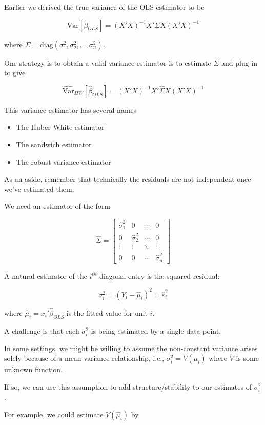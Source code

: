 \documentclass[
  letterpaper,
  DIV=11,
  numbers=noendperiod]{scrreport}
\providecommand{\tightlist}{%
  \setlength{\itemsep}{0pt}\setlength{\parskip}{0pt}}\usepackage{longtable,booktabs,array}
\begin{document}
Earlier we derived the true variance of the OLS estimator to be

\[\text{Var}[\hat \beta_{OLS}] = (X'X)^{-1} X' \Sigma X(X'X)^{-1}
\]

where \(\Sigma = \text{diag}(\sigma_1^2, \sigma_2^2, ..., \sigma_n^2)\).

One strategy is to obtain a valid variance estimator is to estimate
\(\Sigma\) and plug-in to give

\[\widehat{\text{Var}}_{HW}[\hat \beta_{OLS}] = (X'X)^{-1} X' \hat \Sigma X (X'X)^{-1}
\]

This variance estimator has several names

\begin{itemize}
\tightlist
\item
  The Huber-White estimator
\item
  The sandwich estimator
\item
  The robust variance estimator
\end{itemize}

As an aside, remember that technically the residuals are not independent
once we've estimated them.

We need an estimator of the form

\[\hat \Sigma = \begin{bmatrix}
\hat \sigma_1^2 & 0 & \cdots & 0 \\ 
0 & \hat \sigma_2^2 & \cdots & 0 \\ 
\vdots & \vdots & \ddots & \vdots \\ 
0 & 0 & \cdots & \hat \sigma_n^2
\end{bmatrix} 
\]

A natural estimator of the \(i^{th}\) diagonal entry is the squared
residual:

\[\sigma_i^2 = (Y_i - \hat \mu_i)^2 = \hat \varepsilon_i^2
\]

where \(\hat \mu_i = x_i' \hat \beta_{OLS}\) is the fitted value for
unit \(i\).

A challenge is that each \(\sigma_i^2\) is being estimated by a single
data point.

In some settings, we might be willing to assume the non-constant
variance arises solely because of a mean-variance relationship, i.e.,
\(\sigma_i^2 = V(\mu_i)\) where \(V\) is some unknown function.

If so, we can use this assumption to add structure/stability to our
estimates of \(\sigma_i^2\).

For example, we could estimate \(V(\hat \mu_i)\) by
\end{document}

